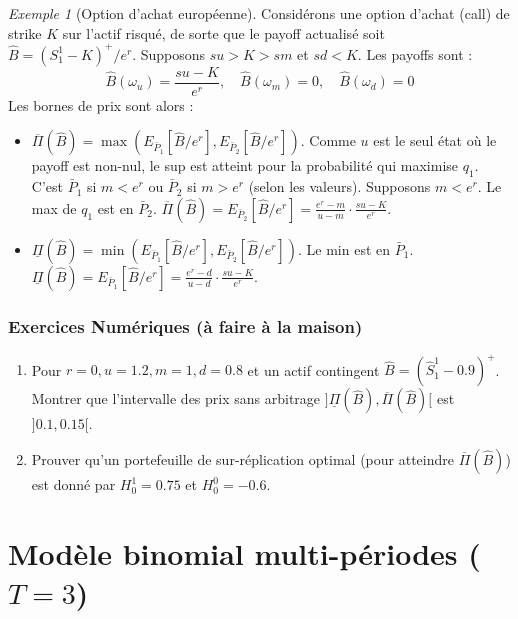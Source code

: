 \documentclass[12pt,a4paper]{article}
\numberwithin{equation}{section}
\theoremstyle{plain} %
\theoremstyle{definition} %
\theoremstyle{remark} %
\theoremstyle{myexample}
\newtheorem{exemple}[definition]{Exemple}
\theoremstyle{definition}
\begin{document}
\begin{exemple}[Option d'achat européenne]
Considérons une option d'achat (call) de strike $K$ sur l'actif risqué, de sorte que le payoff actualisé soit $\hat{B} = (S_1^1 - K)^+/e^r$. Supposons $su > K > sm$ et $sd < K$. Les payoffs sont :
\[
\hat{B}(\omega_u) = \frac{su-K}{e^r}, \quad \hat{B}(\omega_m) = 0, \quad \hat{B}(\omega_d) = 0
\]
Les bornes de prix sont alors :
\begin{itemize}
    \item $\overline{\Pi}(\hat{B}) = \max(E_{\bar{P}_1}[\hat{B}/e^r], E_{\bar{P}_2}[\hat{B}/e^r])$.
    Comme $u$ est le seul état où le payoff est non-nul, le sup est atteint pour la probabilité qui maximise $q_1$. C'est $\bar{P}_1$ si $m < e^r$ ou $\bar{P}_2$ si $m > e^r$ (selon les valeurs).
    Supposons $m < e^r$. Le max de $q_1$ est en $\bar{P}_2$.
    $\overline{\Pi}(\hat{B}) = E_{\bar{P}_2}[\hat{B}/e^r] = \frac{e^r-m}{u-m} \cdot \frac{su-K}{e^r}$.
    \item $\underline{\Pi}(\hat{B}) = \min(E_{\bar{P}_1}[\hat{B}/e^r], E_{\bar{P}_2}[\hat{B}/e^r])$.
    Le min est en $\bar{P}_1$.
    $\underline{\Pi}(\hat{B}) = E_{\bar{P}_1}[\hat{B}/e^r] = \frac{e^r-d}{u-d} \cdot \frac{su-K}{e^r}$.
\end{itemize}
\end{exemple}

\subsubsection*{Exercices Numériques (à faire à la maison)}
\begin{enumerate}
    \item Pour $r=0, u=1.2, m=1, d=0.8$ et un actif contingent $\hat{B} = (\hat{S}_1^1 - 0.9)^+$.
    Montrer que l'intervalle des prix sans arbitrage $]\underline{\Pi}(\hat{B}), \overline{\Pi}(\hat{B})[$ est $]0.1, 0.15[$.
    
    \item Prouver qu'un portefeuille de sur-réplication optimal (pour atteindre $\overline{\Pi}(\hat{B})$) est donné par $H_0^1 = 0.75$ et $H_0^0 = -0.6$.
\end{enumerate}



\section{Modèle binomial multi-périodes ($T=3$)}
\end{document}
